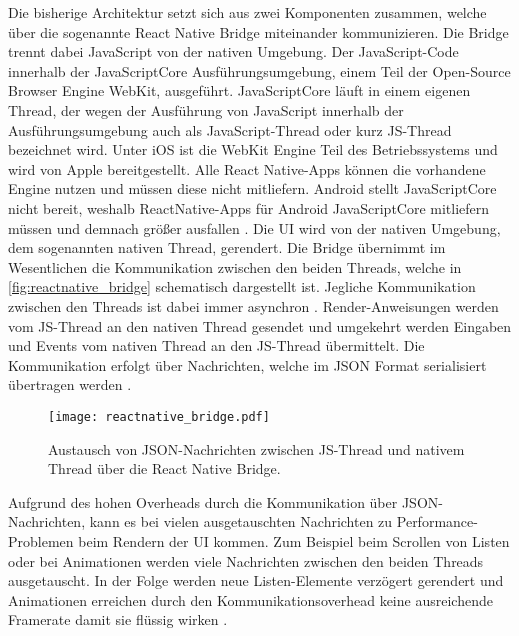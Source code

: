 Die bisherige Architektur setzt sich aus zwei Komponenten zusammen, welche über die sogenannte React Native Bridge miteinander kommunizieren.
Die Bridge trennt dabei JavaScript von der nativen Umgebung.
Der JavaScript-Code innerhalb der JavaScriptCore Ausführungsumgebung, einem Teil der Open-Source Browser Engine WebKit, ausgeführt.
JavaScriptCore läuft in einem eigenen Thread, der wegen der Ausführung von JavaScript innerhalb der Ausführungsumgebung auch als JavaScript-Thread oder kurz JS-Thread bezeichnet wird.
Unter iOS ist die WebKit Engine Teil des Betriebssystems und wird von Apple bereitgestellt.
Alle React Native-Apps können die vorhandene Engine nutzen und müssen diese nicht mitliefern.
Android stellt JavaScriptCore nicht bereit, weshalb ReactNative-Apps für Android JavaScriptCore mitliefern müssen und demnach größer ausfallen \cite{Dragomir_ReactNative,Nawrocki_Comparison_Hybrid_Native_Frameworks}.
Die \ac{UI} wird von der nativen Umgebung, dem sogenannten nativen Thread, gerendert.
Die Bridge übernimmt im Wesentlichen die Kommunikation zwischen den beiden Threads, welche in \autoref{fig:reactnative_bridge} schematisch dargestellt ist.
Jegliche Kommunikation zwischen den Threads ist dabei immer asynchron \cite{ReactNative_newArchitecture}.
Render-Anweisungen werden vom JS-Thread an den nativen Thread gesendet und umgekehrt werden Eingaben und Events vom nativen Thread an den JS-Thread übermittelt.
Die Kommunikation erfolgt über Nachrichten, welche im \ac{JSON} Format serialisiert übertragen werden \cite{Dragomir_ReactNative}.
\begin{figure}[ht]
  \centering
  \texttt{[image: reactnative\_bridge.pdf]}
  \caption{Austausch von JSON-Nachrichten zwischen JS-Thread und nativem Thread über die  React Native Bridge.}
  \label{fig:reactnative_bridge}
\end{figure}

Aufgrund des hohen Overheads durch die Kommunikation über \ac{JSON}-Nachrichten, kann es bei vielen ausgetauschten Nachrichten zu Performance-Problemen beim Rendern der \ac{UI} kommen.
Zum Beispiel beim Scrollen von Listen oder bei Animationen werden viele Nachrichten zwischen den beiden Threads ausgetauscht.
In der Folge werden neue Listen-Elemente verzögert gerendert und Animationen erreichen durch den Kommunikationsoverhead keine ausreichende Framerate damit sie flüssig wirken \cite{Cook_ReactNativeBridge}.

